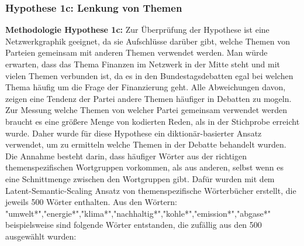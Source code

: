 \subsubsection{Hypothese 1c: Lenkung von Themen}
{\bfseries Methodologie Hypothese 1c:} Zur Überprüfung der Hypothese ist eine Netzwerkgraphik geeignet, da sie Aufschlüsse darüber gibt, welche Themen von Parteien gemeinsam mit anderen Themen verwendet werden. Man würde erwarten, dass das Thema Finanzen im Netzwerk in der Mitte steht und mit vielen Themen verbunden ist, da es in den Bundestagsdebatten egal bei welchen Thema häufig um die Frage der Finanzierung geht. Alle Abweichungen davon, zeigen eine Tendenz der Partei andere Themen häufiger in Debatten zu mogeln. Zur Messung welche Themen von welcher Partei gemeinsam verwendet werden braucht es eine größere Menge von kodierten Reden, als in der Stichprobe erreicht wurde. Daher wurde für diese Hypothese ein diktionär-basierter Ansatz verwendet, um zu ermitteln welche Themen in der Debatte behandelt wurden. Die Annahme besteht darin, dass häufiger Wörter aus der richtigen themenspezifischen Wortgruppen vorkommen, als aus anderen, selbst wenn es eine Schnittmenge zwischen den Wortgruppen gibt. Dafür wurden mit dem Latent-Semantic-Scaling Ansatz von \cite{watanabeSemisupevisedModelDocument2018} themenspezifische Wörterbücher erstellt, die jeweils 500 Wörter enthalten. Aus den Wörtern: "umwelt*","energie*","klima*","nachhaltig*","kohle*","emission*","abgase*" beispielsweise sind folgende Wörter entstanden, die zufällig aus den 500 ausgewählt wurden: \\

\begin{center}
\\
\end{center}

